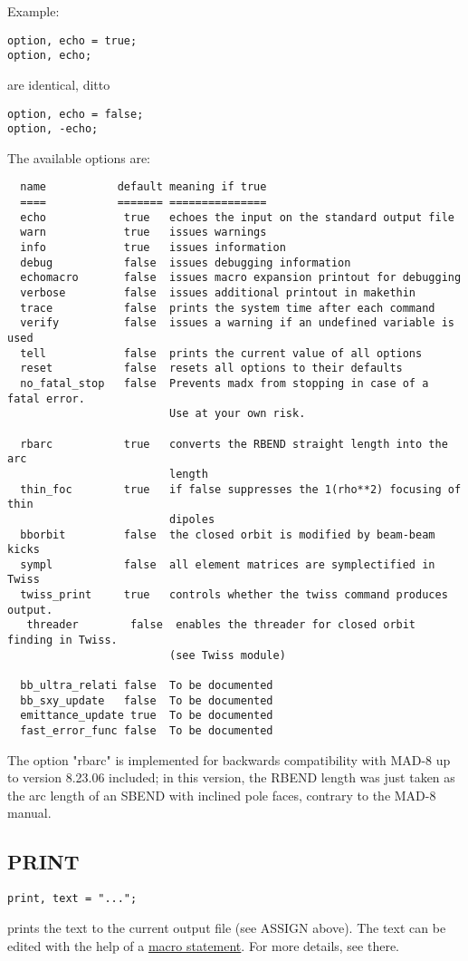 Example: 
\begin{verbatim}
option, echo = true;
option, echo;
\end{verbatim} 
are identical, ditto 
\begin{verbatim}
option, echo = false;
option, -echo;
\end{verbatim} 

The available options are: 
\begin{verbatim}
  name           default meaning if true
  ====           ======= ===============
  echo            true   echoes the input on the standard output file
  warn            true   issues warnings
  info            true   issues information
  debug           false  issues debugging information
  echomacro       false  issues macro expansion printout for debugging
  verbose         false  issues additional printout in makethin
  trace           false  prints the system time after each command
  verify          false  issues a warning if an undefined variable is used
  tell            false  prints the current value of all options
  reset           false  resets all options to their defaults
  no_fatal_stop   false  Prevents madx from stopping in case of a fatal error. 
                         Use at your own risk.

  rbarc           true   converts the RBEND straight length into the arc 
                         length
  thin_foc        true   if false suppresses the 1(rho**2) focusing of thin 
                         dipoles
  bborbit         false  the closed orbit is modified by beam-beam kicks
  sympl           false  all element matrices are symplectified in Twiss
  twiss_print     true   controls whether the twiss command produces output.
   threader        false  enables the threader for closed orbit finding in Twiss.
                         (see Twiss module)

  bb_ultra_relati false  To be documented
  bb_sxy_update   false  To be documented 
  emittance_update true  To be documented
  fast_error_func false  To be documented
\end{verbatim} 

The option "rbarc" is implemented for backwards compatibility with MAD-8
up to version 8.23.06 included; in this version, the RBEND length was
just taken as the arc length of an SBEND with inclined pole faces,
contrary to the MAD-8 manual.  


\subsection{PRINT}
\begin{verbatim}
print, text = "...";
\end{verbatim} 
prints the text to the current output file (see ASSIGN above). The text
can be edited with the help of a  \href{special.html#macro}{macro
  statement}. For more details, see there.  


